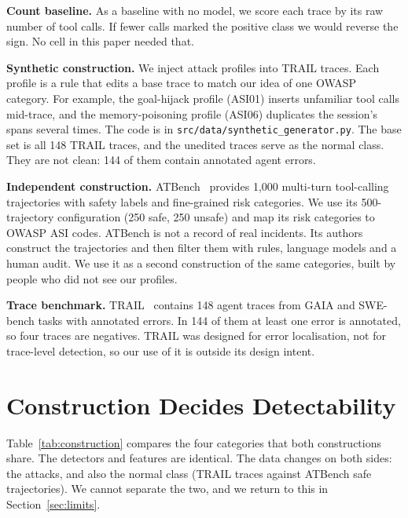 \documentclass[conference]{IEEEtran}
\begin{document}
\textbf{Count baseline.} As a baseline with no model, we score each trace by its raw number of tool calls. If fewer calls marked the positive class we would reverse the sign. No cell in this paper needed that.

\textbf{Synthetic construction.} We inject attack profiles into TRAIL traces. Each profile is a rule that edits a base trace to match our idea of one OWASP category. For example, the goal-hijack profile (ASI01) inserts unfamiliar tool calls mid-trace, and the memory-poisoning profile (ASI06) duplicates the session's spans several times. The code is in \texttt{src/data/synthetic\_generator.py}. The base set is all 148 TRAIL traces, and the unedited traces serve as the normal class. They are not clean: 144 of them contain annotated agent errors.

\textbf{Independent construction.} ATBench~\cite{atbench2026} provides 1,000 multi-turn tool-calling trajectories with safety labels and fine-grained risk categories. We use its 500-trajectory configuration (250 safe, 250 unsafe) and map its risk categories to OWASP ASI codes. ATBench is not a record of real incidents. Its authors construct the trajectories and then filter them with rules, language models and a human audit. We use it as a second construction of the same categories, built by people who did not see our profiles.

\textbf{Trace benchmark.} TRAIL~\cite{patronus2024trail} contains 148 agent traces from GAIA and SWE-bench tasks with annotated errors. In 144 of them at least one error is annotated, so four traces are negatives. TRAIL was designed for error localisation, not for trace-level detection, so our use of it is outside its design intent.

\section{Construction Decides Detectability}
\label{sec:construction}

Table~\ref{tab:construction} compares the four categories that both constructions share. The detectors and features are identical. The data changes on both sides: the attacks, and also the normal class (TRAIL traces against ATBench safe trajectories). We cannot separate the two, and we return to this in Section~\ref{sec:limits}.
\end{document}
